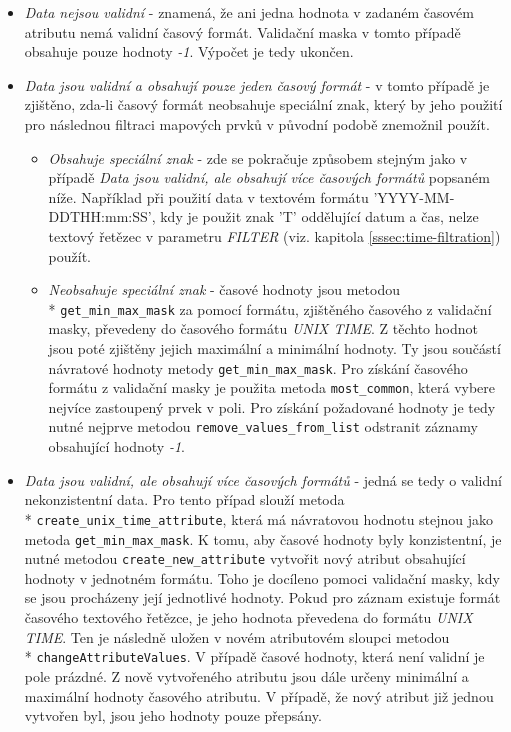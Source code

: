 \begin{itemize}
\item\textit{Data nejsou validní} - znamená, že ani jedna
hodnota v zadaném časovém atributu nemá validní časový
formát. Validační maska v tomto případě obsahuje pouze hodnoty
\textit{-1}. Výpočet je tedy ukončen.
\item\textit{Data jsou validní a obsahují pouze jeden časový
formát} - v tomto případě je zjištěno, zda-li časový formát
neobsahuje speciální znak, který by jeho použití pro následnou
filtraci mapových prvků v původní podobě znemožnil použít.
\begin{itemize}
\item\textit{Obsahuje speciální znak} - zde se pokračuje
způsobem stejným jako v případě \textit{Data jsou
	validní, ale obsahují více časových formátů} popsaném
níže. Například při použití data v textovém formátu
'YYYY-MM-DDTHH:mm:SS', kdy je použit znak 'T' oddělující
datum a čas, nelze textový řetězec v parametru
\textit{FILTER} (viz. kapitola \ref{sssec:time-filtration})
použít.
\item\textit{Neobsahuje speciální znak} - časové hodnoty
jsou metodou \\* \verb|get_min_max_mask| za pomocí formátu,
zjištěného časového z validační masky, převedeny do
časového formátu \textit{UNIX TIME}. Z těchto hodnot
jsou poté zjištěny jejich maximální a minimální
hodnoty. Ty jsou součástí návratové hodnoty metody
\verb|get_min_max_mask|.
Pro získání časového formátu z validační masky je
použita metoda \verb|most_common|, která vybere nejvíce
zastoupený prvek v poli. Pro získání požadované hodnoty
je tedy nutné nejprve metodou \verb|remove_values_from_list|
odstranit záznamy obsahující hodnoty \textit{-1}.
\end{itemize}
\item\textit{Data jsou validní, ale obsahují více časových
formátů} - jedná se tedy o validní nekonzistentní data. Pro tento
případ slouží metoda \\* \verb|create_unix_time_attribute|, která
má návratovou hodnotu stejnou jako metoda \verb|get_min_max_mask|. K
tomu, aby časové hodnoty byly konzistentní, je nutné metodou
\verb|create_new_attribute| vytvořit nový atribut obsahující
hodnoty v jednotném formátu. Toho je docíleno pomoci validační
masky, kdy se jsou procházeny její jednotlivé hodnoty. Pokud
pro záznam existuje formát časového textového řetězce,
je jeho hodnota převedena do formátu \textit{UNIX TIME}. Ten
je následně uložen v novém atributovém sloupci metodou \\*
\verb|changeAttributeValues|. V případě časové hodnoty, která
není validní je pole prázdné. Z nově vytvořeného atributu
jsou dále určeny minimální a maximální hodnoty časového
atributu. V případě, že nový atribut již jednou vytvořen byl,
jsou jeho hodnoty pouze přepsány.
\end{itemize}

